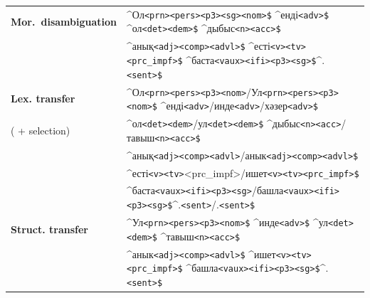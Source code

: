 \documentclass[a4paper,11pt]{article}
\newcommand{\tag}[1]{{\small{\texttt{#1}}}}
\begin{document}
\begin{table}[htbp]
\begin{tabular}{ll}
\midrule
{\bf Mor.\ disambiguation} & \^{}Ол\tag{<prn>}\tag{<pers>}\tag{<p3>}\tag{<sg>}\tag{<nom>}\tag{\$} \^{}енді\tag{<adv>}\tag{\$} \^{}ол\tag{<det>}\tag{<dem>}\tag{\$} \^{}дыбыс\tag{<n>}\tag{<acc>}\tag{\$} \\
                     & \^{}анық\tag{<adj>}\tag{<comp>}\tag{<advl>}\tag{\$} \^{}есті\tag{<v>}\tag{<tv>}\tag{<prc\_impf>}\tag{\$} \^{}баста\tag{<vaux>}\tag{<ifi>}\tag{<p3>}\tag{<sg>}\tag{\$}\^{}.\tag{<sent>}\tag{\$} \\
\midrule
{\bf Lex. transfer} & \^{}Ол\tag{<prn>}\tag{<pers>}\tag{<p3>}\tag{<nom>}/Ул\tag{<prn>}\tag{<pers>}\tag{<p3>}\tag{<nom>}\tag{\$} \^{}енді\tag{<adv>}/инде\tag{<adv>}/хәзер\tag{<adv>}\tag{\$} \\
 ( + selection)     & \^{}ол\tag{<det>}\tag{<dem>}/ул\tag{<det>}\tag{<dem>}\tag{\$} \^{}дыбыс\tag{<n>}\tag{<acc>}/тавыш\tag{<n>}\tag{<acc>}\tag{\$} \\
                    & \^{}анық\tag{<adj>}\tag{<comp>}\tag{<advl>}/анык\tag{<adj>}\tag{<comp>}\tag{<advl>}\tag{\$}  \\
						  & \^{}есті\tag{<v>}\tag{<tv>}<prc\_impf>/ишет\tag{<v>}\tag{<tv>}\tag{<prc\_impf>}\tag{\$} \\
                    & \^{}баста\tag{<vaux>}\tag{<ifi>}\tag{<p3>}\tag{<sg>}/башла\tag{<vaux>}\tag{<ifi>}\tag{<p3>}\tag{<sg>}\tag{\$}\^{}.\tag{<sent>}/.\tag{<sent>}\tag{\$} \\
\midrule
{\bf Struct. transfer}& \^{}Ул\tag{<prn>}\tag{<pers>}\tag{<p3>}\tag{<nom>}\tag{\$} \^{}инде\tag{<adv>}\tag{\$} \^{}ул\tag{<det>}\tag{<dem>}\tag{\$} \^{}тавыш\tag{<n>}\tag{<acc>}\tag{\$} \\
                      & \^{}анык\tag{<adj>}\tag{<comp>}\tag{<advl>}\tag{\$} \^{}ишет\tag{<v>}\tag{<tv>}\tag{<prc\_impf>}\tag{\$} \^{}башла\tag{<vaux>}\tag{<ifi>}\tag{<p3>}\tag{<sg>}\tag{\$}\^{}.\tag{<sent>}\tag{\$} \\


\end{tabular}
\end{table}
\end{document}
